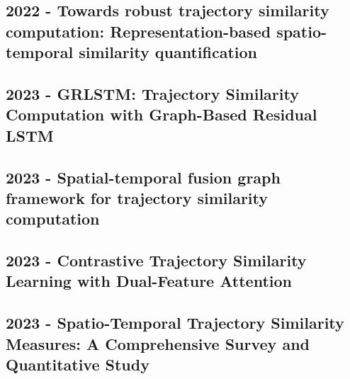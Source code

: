 \subsection*{2022 - Towards robust trajectory similarity computation: Representation-based spatio-temporal similarity quantification}
\cite{chen2022towards}

\subsection*{2023 - GRLSTM: Trajectory Similarity Computation with Graph-Based Residual LSTM}
\cite{zhou2023grlstm}

\subsection*{2023 - Spatial-temporal fusion graph framework for trajectory similarity computation}
\cite{zhou2023spatial}

\subsection*{2023 - Contrastive Trajectory Similarity Learning with Dual-Feature Attention}
\cite{chang2023contrastive}

\subsection*{2023 - Spatio-Temporal Trajectory Similarity Measures: A Comprehensive Survey and Quantitative Study}
\cite{hu2023spatio}